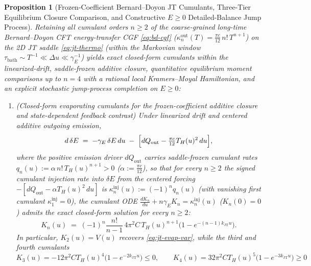 \documentclass[11pt,a4paper]{article}
\newtheorem{proposition}{Proposition}
\theoremstyle{definition}
\theoremstyle{remark}
\newcommand{\1}{\mathbf{1}}
\begin{document}
\begin{proposition}[Frozen-Coefficient Bernard--Doyon JT Cumulants, Three-Tier Equilibrium Closure Comparison, and Constructive $E\ge 0$ Detailed-Balance Jump Process]\label{prop:jt-nongaussian}
Retaining all cumulant orders $n\ge 2$ of the coarse-grained long-time Bernard--Doyon CFT energy-transfer CGF \eqref{eq:bd-cgf} ($\kappa_n^{\mathrm{out}}(T) = \frac{\pi c}{12}\,n!\,T^{n+1}$) on the 2D JT saddle \eqref{eq:jt-thermo} (within the Markovian window $\tau_{\mathrm{bath}}\sim T^{-1} \ll \Delta u \ll \gamma_E^{-1}$) yields exact closed-form cumulants within the linearized-drift, saddle-frozen additive closure, quantitative equilibrium moment comparisons up to $n=4$ with a rational local Kramers--Moyal Hamiltonian, and an explicit stochastic jump-process completion on $E\ge 0$:
\begin{enumerate}
  \item[(a)] \emph{(Closed-form evaporating cumulants for the frozen-coefficient additive closure and state-dependent feedback contrast)} Under linearized drift and centered additive outgoing emission,
  \begin{equation}\label{eq:jt-centered-sde}
    d\,\delta E \;=\; -\gamma_E\,\delta E\,du \;-\; \Bigl[dQ_{\mathrm{out}} - \tfrac{\pi c}{12}T_H(u)^2\,du\Bigr],
  \end{equation}
  where the positive emission driver $dQ_{\mathrm{out}}$ carries saddle-frozen cumulant rates $q_n(u) := \alpha\,n!\,T_H(u)^{n+1} > 0$ ($\alpha := \frac{\pi c}{12}$), so that for every $n\ge 2$ the signed cumulant injection rate into $\delta E$ from the centered forcing $-[dQ_{\mathrm{out}} - \alpha T_H(u)^2\,du]$ is $\kappa_n^{\mathrm{inj}}(u) := (-1)^n q_n(u)$ (with vanishing first cumulant $\kappa_1^{\mathrm{inj}}=0$), the cumulant ODE $\frac{dK_n}{du} + n\gamma_E K_n = \kappa_n^{\mathrm{inj}}(u)$ ($K_n(0)=0$) admits the exact closed-form solution for every $n\ge 2$:
  \begin{equation}\label{eq:jt-kn}
    K_n(u) \;=\; (-1)^n \frac{n!}{n-1}\,4\pi^2 C\,T_H(u)^{n+1}\bigl(1 - e^{-(n-1)k_{\mathrm{JT}}u}\bigr).
  \end{equation}
  In particular, $K_2(u)=V(u)$ recovers \eqref{eq:jt-evap-var}, while the third and fourth cumulants
  \begin{equation}\label{eq:jt-k3-k4}
    K_3(u) = -12\pi^2 C T_H(u)^4\bigl(1 - e^{-2k_{\mathrm{JT}}u}\bigr) \le 0, \qquad
    K_4(u) = 32\pi^2 C T_H(u)^5\bigl(1 - e^{-3k_{\mathrm{JT}}u}\bigr) \ge 0
  \end{equation}

\end{enumerate}
\end{proposition}
\end{document}
